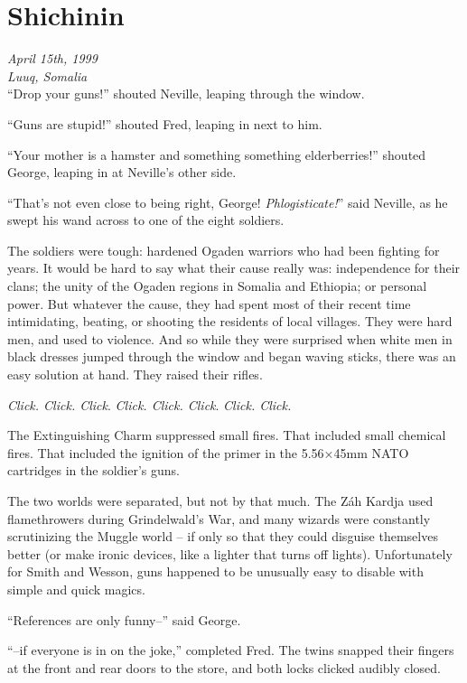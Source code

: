 \Startbonus

\hypertarget{shichinin}{%
\chapter{Shichinin}\label{shichinin}}

\emph{April 15th, 1999}\\
\emph{Luuq, Somalia}\\

``Drop your guns!'' shouted Neville, leaping through the window.

``Guns are stupid!'' shouted Fred, leaping in next to him.

``Your mother is a hamster and something something elderberries!''
shouted George, leaping in at Neville's other side.

``That's not even close to being right, George! \emph{Phlogisticate!}''
said Neville, as he swept his wand across to one of the eight soldiers.

The soldiers were tough: hardened Ogaden warriors who had been fighting
for years. It would be hard to say what their cause really was:
independence for their clans; the unity of the Ogaden regions in Somalia
and Ethiopia; or personal power. But whatever the cause, they had spent
most of their recent time intimidating, beating, or shooting the
residents of local villages. They were hard men, and used to violence.
And so while they were surprised when white men in black dresses jumped
through the window and began waving sticks, there was an easy solution
at hand. They raised their rifles.

\emph{Click. Click. Click}. \emph{Click. Click. Click}. \emph{Click.
Click.}

The Extinguishing Charm suppressed small fires. That included small
chemical fires. That included the ignition of the primer in the
5.56×45mm NATO cartridges in the soldier's guns.

The two worlds were separated, but not by that much. The Záh Kardja used
flamethrowers during Grindelwald's War, and many wizards were constantly
scrutinizing the Muggle world -- if only so that they could disguise
themselves better (or make ironic devices, like a lighter that turns off
lights). Unfortunately for Smith and Wesson, guns happened to be
unusually easy to disable with simple and quick magics.

``References are only funny--'' said George.

``--if everyone is in on the joke,'' completed Fred. The twins snapped
their fingers at the front and rear doors to the store, and both locks
clicked audibly closed.

